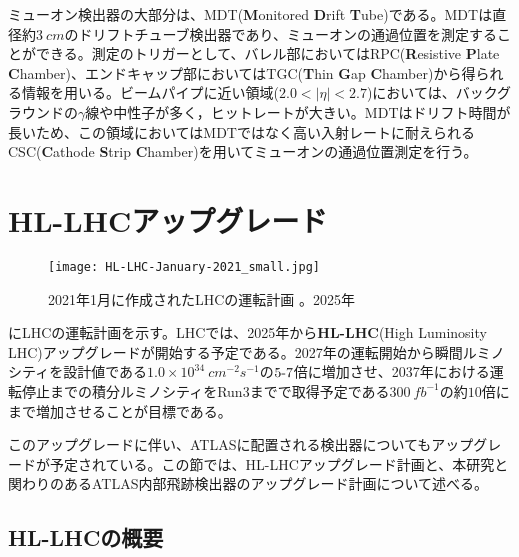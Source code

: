ミューオン検出器の大部分は、MDT(\textbf{M}onitored \textbf{D}rift \textbf{T}ube)である。MDTは直径約$3\ \si{cm}$のドリフトチューブ検出器であり、ミューオンの通過位置を測定することができる。測定のトリガーとして、バレル部においてはRPC(\textbf{R}esistive \textbf{P}late \textbf{C}hamber)、エンドキャップ部においてはTGC(\textbf{T}hin \textbf{G}ap \textbf{C}hamber)から得られる情報を用いる。ビームパイプに近い領域($2.0<|\eta|<2.7$)においては、バックグラウンドの$\gamma$線や中性子が多く，ヒットレートが大きい。MDTはドリフト時間が長いため、この領域においてはMDTではなく高い入射レートに耐えられるCSC(\textbf{C}athode \textbf{S}trip \textbf{C}hamber)を用いてミューオンの通過位置測定を行う。







\section{HL-LHCアップグレード}
\label{sec:HL-LHC}
\begin{figure}[tbp]
  \centering
  \texttt{[image: HL-LHC-January-2021\_small.jpg]}
  \caption[LHCの運転計画]{2021年1月に作成されたLHCの運転計画 \cite{hl-lhc}。2025年 }
  \label{fig:hl-lhc}
\end{figure}

にLHCの運転計画を示す。LHCでは、2025年から\textbf{HL-LHC}(High Luminosity LHC)アップグレードが開始する予定である。2027年の運転開始から瞬間ルミノシティを設計値である$1.0\times 10^{34}\ \si{cm^{-2}s^{-1}}$の$5 \mathchar`- 7$倍に増加させ、2037年における運転停止までの積分ルミノシティをRun3までで取得予定である$300\ \si{fb^{-1}}$の約$10$倍にまで増加させることが目標である。

このアップグレードに伴い、ATLASに配置される検出器についてもアップグレードが予定されている。この節では、HL-LHCアップグレード計画と、本研究と関わりのあるATLAS内部飛跡検出器のアップグレード計画について述べる。

\subsection{HL-LHCの概要}
\label{sec:HL-LHC-gaiyou}

